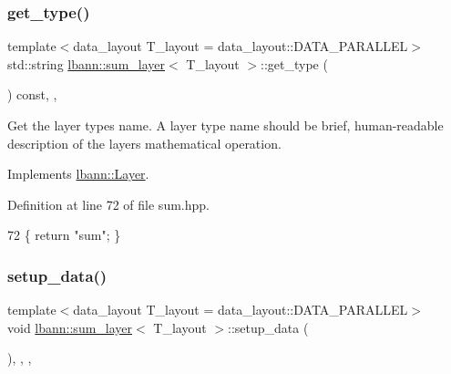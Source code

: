 \subsubsection{\texorpdfstring{get\+\_\+type()}{get\_type()}}
{\footnotesize\ttfamily template$<$data\+\_\+layout T\+\_\+layout = data\+\_\+layout\+::\+D\+A\+T\+A\+\_\+\+P\+A\+R\+A\+L\+L\+EL$>$ \\
std\+::string \hyperlink{classlbann_1_1sum__layer}{lbann\+::sum\+\_\+layer}$<$ T\+\_\+layout $>$\+::get\+\_\+type (\begin{DoxyParamCaption}{ }\end{DoxyParamCaption}) const\hspace{0.3cm}{\ttfamily [inline]}, {\ttfamily [override]}, {\ttfamily [virtual]}}

Get the layer type\textquotesingle{}s name. A layer type name should be brief, human-\/readable description of the layer\textquotesingle{}s mathematical operation. 

Implements \hyperlink{classlbann_1_1Layer_a0fa0ea9160b490c151c0a17fde4f7239}{lbann\+::\+Layer}.



Definition at line 72 of file sum.\+hpp.


\begin{DoxyCode}
72 \{ \textcolor{keywordflow}{return} \textcolor{stringliteral}{"sum"}; \}
\end{DoxyCode}
\mbox{\label{classlbann_1_1sum__layer_a9f8659993a180f1bb1a8bd875814d33b}} 
\subsubsection{\texorpdfstring{setup\+\_\+data()}{setup\_data()}}
{\footnotesize\ttfamily template$<$data\+\_\+layout T\+\_\+layout = data\+\_\+layout\+::\+D\+A\+T\+A\+\_\+\+P\+A\+R\+A\+L\+L\+EL$>$ \\
void \hyperlink{classlbann_1_1sum__layer}{lbann\+::sum\+\_\+layer}$<$ T\+\_\+layout $>$\+::setup\+\_\+data (\begin{DoxyParamCaption}{ }\end{DoxyParamCaption})\hspace{0.3cm}{\ttfamily [inline]}, {\ttfamily [override]}, {\ttfamily [protected]}, {\ttfamily [virtual]}}

